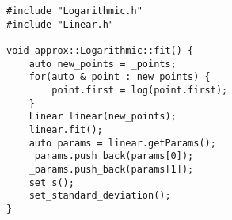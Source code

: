 \begin{lstlisting}
#include "Logarithmic.h"
#include "Linear.h"

void approx::Logarithmic::fit() {
    auto new_points = _points;
    for(auto & point : new_points) {
        point.first = log(point.first);
    }
    Linear linear(new_points);
    linear.fit();
    auto params = linear.getParams();
    _params.push_back(params[0]);
    _params.push_back(params[1]);
    set_s();
    set_standard_deviation();
}

\end{lstlisting}